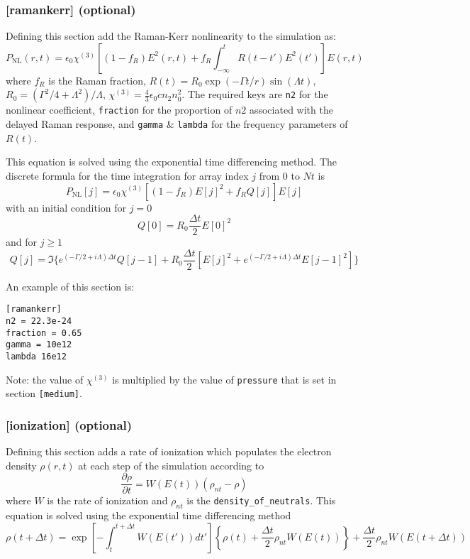 \documentclass{article}
\begin{document}
\subsubsection{[ramankerr] (optional)}
Defining this section add the Raman-Kerr nonlinearity to the
simulation as:
\[P_{\mathrm{NL}}(r,t) = \epsilon_0 \chi^{(3)} \left[(1-f_R) E^2(r,t)
    + f_R\int_{-\infty}^t R(t-t') E^2(t')\right] E(r,t)\] where $f_R$
is the Raman fraction, $R(t) = R_0 \exp(-\Gamma t/r) \sin(\Lambda t)$,
$R_0 = (\Gamma^2/4 + \Lambda^2) / \Lambda$,
$\chi^{(3)} = \frac43 \epsilon_0 c n_2 n_0^2$.  The required keys are
\texttt{n2} for the nonlinear coefficient, \texttt{fraction} for the
proportion of $n2$ associated with the delayed Raman response, and
\texttt{gamma} \& \texttt{lambda} for the frequency parameters of
$R(t)$.

This equation is solved using the exponential time differencing
method. The discrete formula for the time integration for array index
$j$ from 0 to $Nt$ is
\[P_{\mathrm{NL}}[j] = \epsilon_0 \chi^{(3)} \left[(1-f_R) E[j]^2 + f_R Q[j]\right] E[j] \]
with an initial condition for $j = 0$
\[Q[0] = R_0 \frac{\Delta t}{2} E[0]^2\]
and for $j \ge 1$
\[Q[j] = \Im\bigg\{e^{(-\Gamma/2 + i\Lambda)\Delta t} Q[j-1] + R_0\frac{\Delta t}{2} \left[E[j]^2 + e^{(-\Gamma/2 + i\Lambda)\Delta t} E[j-1]^2\right]\bigg\}\]

An example of this section is:
\begin{lstlisting}
[ramankerr]
n2 = 22.3e-24
fraction = 0.65
gamma = 10e12
lambda 16e12
\end{lstlisting}


Note: the value of
$\chi^{(3)}$ is multiplied by the value of \texttt{pressure} that is
set in section \texttt{[medium]}.

\subsubsection{[ionization] (optional)}
Defining this section adds a rate of ionization which populates the
electron density $\rho(r,t)$ at each step of the simulation according to
\[\frac{\partial \rho}{\partial t} = W(E(t)) (\rho_{nt}-\rho)\]
where $W$ is the rate of ionization and $\rho_{nt}$ is the
\texttt{density\_of\_neutrals}.  This equation is solved using the
exponential time differencing method
\[\rho(t+\Delta t) = \exp\left[-\int_t^{t+\Delta t} W(E(t')) dt'\right]\left\{\rho(t) + \frac{\Delta t}{2} \rho_{nt}W(E(t))\right\} + \frac{\Delta t}{2} \rho_{nt} W(E(t+\Delta t))\]
\end{document}
